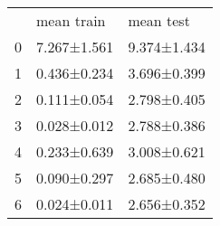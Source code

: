 \begin{tabular}{lll}
 & mean train & mean test \\
0 & 7.267±1.561 & 9.374±1.434 \\
1 & 0.436±0.234 & 3.696±0.399 \\
2 & 0.111±0.054 & 2.798±0.405 \\
3 & 0.028±0.012 & 2.788±0.386 \\
4 & 0.233±0.639 & 3.008±0.621 \\
5 & 0.090±0.297 & 2.685±0.480 \\
6 & 0.024±0.011 & 2.656±0.352 \\
\end{tabular}
